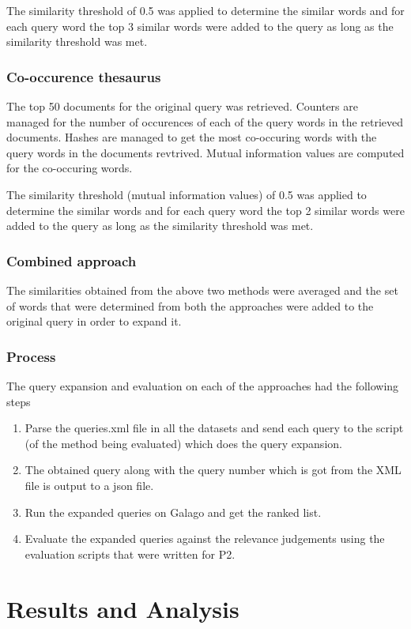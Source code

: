 \documentclass[a4paper, 12pt, notitlepage]{report}
\begin{document}
The similarity threshold of 0.5 was applied to determine the similar words and for each query word the top 3 similar words were added to the query as long as the similarity threshold was met.
 
\subsection*{Co-occurence thesaurus}
The top 50 documents for the original query was retrieved. Counters are managed for the number of occurences of each of the query words in the retrieved documents. Hashes are managed to get the most co-occuring words with the query words in the documents revtrived. Mutual information values are computed for the co-occuring words.

The similarity threshold (mutual information values) of 0.5 was applied to determine the similar words and for each query word the top 2 similar words were added to the query as long as the similarity threshold was met.  

\subsection*{Combined approach}
The similarities obtained from the above two methods were averaged and the set of words that were determined from both the approaches were added to the original query in order to expand it.

\subsection*{Process}
The query expansion and evaluation on each of the approaches had the following steps
\begin{enumerate}
\item Parse the queries.xml file in all the datasets and send each query to the script (of the method being evaluated) which does the query expansion.
\item The obtained query along with the query number which is got from the XML file is output to a json file.
\item Run the expanded queries on Galago and get the ranked list.
\item Evaluate the expanded queries against the relevance judgements using the evaluation scripts that were written for P2.
\end{enumerate}


\chapter{Results and Analysis}
\end{document}
